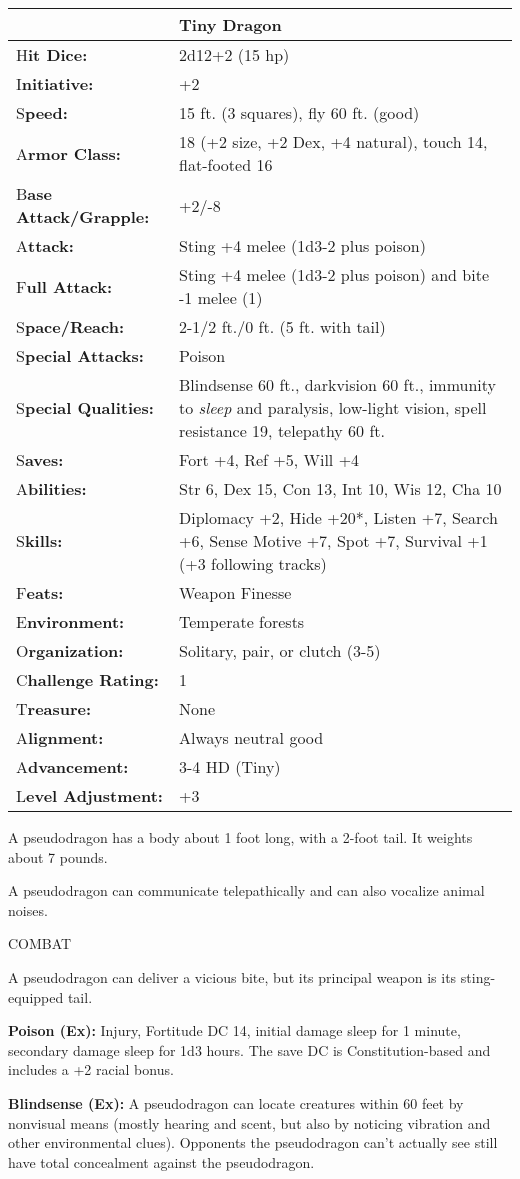 \documentclass{article}
\begin{document}
\begin{tabular}{|>{\raggedright}p{89pt}|>{\raggedright}p{237pt}|}
\hline
  & Tiny Dragon\tabularnewline
\hline
H\textbf{it Dice:} & 2d12+2 (15 hp)\tabularnewline
\hline
I\textbf{nitiative:} & +2\tabularnewline
\hline
S\textbf{peed:} & 15 ft. (3 squares), fly 60 ft. (good)\tabularnewline
\hline
A\textbf{rmor Class:} & 18 (+2 size, +2 Dex, +4 natural), touch 14, flat-footed 
16\tabularnewline
\hline
B\textbf{ase Attack/Grapple:} & +2/-8\tabularnewline
\hline
A\textbf{ttack:} & Sting +4 melee (1d3-2 plus poison)\tabularnewline
\hline
F\textbf{ull Attack:} & Sting +4 melee (1d3-2 plus poison) and bite -1 melee (1)\tabularnewline
\hline
S\textbf{pace/Reach:} & 2-1/2 ft./0 ft. (5 ft. with tail)\tabularnewline
\hline
S\textbf{pecial Attacks:} & Poison\tabularnewline
\hline
S\textbf{pecial Qualities:} & Blindsense 60 ft., darkvision 60 ft., immunity to 
\textit{sleep }and paralysis, low-light vision, spell resistance 19, telepathy 
60 ft.\tabularnewline
\hline
S\textbf{aves:} & Fort +4, Ref +5, Will +4\tabularnewline
\hline
A\textbf{bilities:} & Str 6, Dex 15, Con 13, Int 10, Wis 12, Cha 10\tabularnewline
\hline
S\textbf{kills:} & Diplomacy +2, Hide +20*, Listen +7, Search +6, Sense Motive 
+7, Spot +7, Survival +1 (+3 following tracks)\tabularnewline
\hline
F\textbf{eats:} & Weapon Finesse\tabularnewline
\hline
E\textbf{nvironment:} & Temperate forests\tabularnewline
\hline
O\textbf{rganization:} & Solitary, pair, or clutch (3-5)\tabularnewline
\hline
C\textbf{hallenge Rating:} & 1\tabularnewline
\hline
T\textbf{reasure:} & None\tabularnewline
\hline
A\textbf{lignment:} & Always neutral good\tabularnewline
\hline
A\textbf{dvancement:} & 3-4 HD (Tiny)\tabularnewline
\hline
L\textbf{evel Adjustment:} & +3\tabularnewline
\hline
\end{tabular}

A pseudodragon has a body about 1 foot long, with a 2-foot tail. It weights about 
7 pounds.

A pseudodragon can communicate telepathically and can also vocalize animal noises.

COMBAT

A pseudodragon can deliver a vicious bite, but its principal weapon is its sting-equipped 
tail.

\textbf{Poison (Ex): }Injury, Fortitude DC 14, initial damage sleep for 1 minute, 
secondary damage sleep for 1d3 hours. The save DC is Constitution-based and includes 
a +2 racial bonus.

\textbf{Blindsense (Ex):} A pseudodragon can locate creatures within 60 feet by 
nonvisual means (mostly hearing and scent, but also by noticing vibration and other 
environmental clues). Opponents the pseudodragon can't actually see still have 
total concealment against the pseudodragon.
\end{document}

